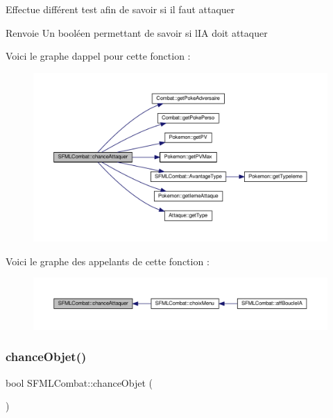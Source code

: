 Effectue différent test afin de savoir si il faut attaquer \begin{DoxyReturn}{Renvoie}
Un booléen permettant de savoir si l\textquotesingle{}IA doit attaquer 
\end{DoxyReturn}
Voici le graphe d\textquotesingle{}appel pour cette fonction \+:\nopagebreak
\begin{figure}[H]
\begin{center}
\leavevmode
\includegraphics[width=350pt]{class_s_f_m_l_combat_ac8720bfe637fdaa932ef45240493bbd6_cgraph}
\end{center}
\end{figure}
Voici le graphe des appelants de cette fonction \+:\nopagebreak
\begin{figure}[H]
\begin{center}
\leavevmode
\includegraphics[width=350pt]{class_s_f_m_l_combat_ac8720bfe637fdaa932ef45240493bbd6_icgraph}
\end{center}
\end{figure}
\mbox{\label{class_s_f_m_l_combat_a00370ff45d848befb5d35c52bd1db2d5}} 
\subsubsection{\texorpdfstring{chance\+Objet()}{chanceObjet()}}
{\footnotesize\ttfamily bool S\+F\+M\+L\+Combat\+::chance\+Objet (\begin{DoxyParamCaption}{ }\end{DoxyParamCaption})\hspace{0.3cm}{\ttfamily [private]}}



